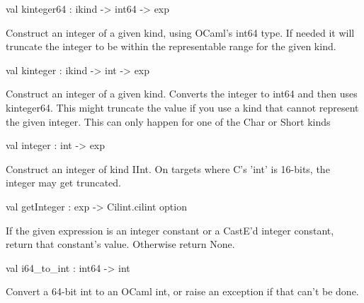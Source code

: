 \documentclass[11pt]{article}
\begin{document}
\label{val:Cil.kinteger64}\begin{ocamldoccode}
val kinteger64 : ikind -> int64 -> exp
\end{ocamldoccode}
\begin{ocamldocdescription}
Construct an integer of a given kind, using OCaml's int64 type. If needed 
 it will truncate the integer to be within the representable range for the 
 given kind.


\end{ocamldocdescription}




\label{val:Cil.kinteger}\begin{ocamldoccode}
val kinteger : ikind -> int -> exp
\end{ocamldoccode}
\begin{ocamldocdescription}
Construct an integer of a given kind. Converts the integer to int64 and 
 then uses kinteger64. This might truncate the value if you use a kind 
 that cannot represent the given integer. This can only happen for one of 
 the Char or Short kinds


\end{ocamldocdescription}




\label{val:Cil.integer}\begin{ocamldoccode}
val integer : int -> exp
\end{ocamldoccode}
\begin{ocamldocdescription}
Construct an integer of kind IInt. On targets where C's 'int' is 16-bits,
    the integer may get truncated.


\end{ocamldocdescription}




\label{val:Cil.getInteger}\begin{ocamldoccode}
val getInteger : exp -> Cilint.cilint option
\end{ocamldoccode}
\begin{ocamldocdescription}
If the given expression is an integer constant or a CastE'd
    integer constant, return that constant's value. 
    Otherwise return None.


\end{ocamldocdescription}




\label{val:Cil.i64-underscoreto-underscoreint}\begin{ocamldoccode}
val i64_to_int : int64 -> int
\end{ocamldoccode}
\begin{ocamldocdescription}
Convert a 64-bit int to an OCaml int, or raise an exception if that
    can't be done.


\end{ocamldocdescription}
\end{document}
